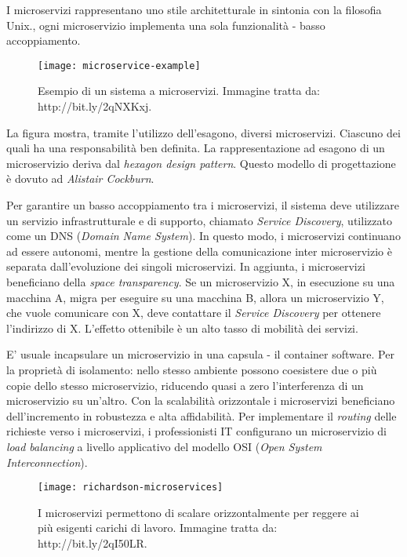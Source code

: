 I microservizi rappresentano uno stile architetturale in sintonia con la 
filosofia Unix., ogni microservizio implementa una sola funzionalità - basso 
accoppiamento.

\begin{figure}[htbp]
	\begin{center}
		\texttt{[image: microservice-example]}
		\caption{Esempio di un sistema a microservizi. Immagine tratta 
                 da: http://bit.ly/2qNXKxj.}
	\end{center}
\end{figure}

La figura mostra, tramite l'utilizzo dell'esagono, diversi microservizi. 
Ciascuno dei quali ha una responsabilità ben definita. La rappresentazione 
ad esagono di un microservizio deriva dal \emph{hexagon design pattern}. 
Questo modello di progettazione è dovuto ad \emph{Alistair Cockburn}.

Per garantire un basso accoppiamento tra i microservizi, 
il sistema deve utilizzare un servizio infrastrutturale e di 
supporto, chiamato \textit{Service Discovery}, utilizzato come un DNS 
(\textit{Domain Name System}). In questo modo, i microservizi continuano ad 
essere autonomi, mentre la gestione della comunicazione inter microservizio è 
separata dall'evoluzione dei singoli microservizi. 
In aggiunta, i microservizi beneficiano della \textit{space transparency}. Se 
un microservizio X, in esecuzione su una macchina A, migra per eseguire su una 
macchina B, allora un microservizio Y, che vuole comunicare con X, deve 
contattare il \textit{Service Discovery} per ottenere l'indirizzo di X. 
L'effetto ottenibile è un alto tasso di mobilità dei servizi.  

E' usuale incapsulare un microservizio in una capsula - il container software. 
Per la proprietà di isolamento: nello stesso ambiente possono coesistere due o 
più copie dello stesso microservizio, riducendo quasi a zero l'interferenza di 
un microservizio su un'altro. 
Con la scalabilità orizzontale i microservizi beneficiano dell'incremento in 
robustezza e alta affidabilità. Per implementare il \textit{routing} delle 
richieste verso i microservizi, i professionisti IT configurano un 
microservizio di \textit{load balancing} a livello applicativo del modello OSI 
(\textit{Open System Interconnection}).


\begin{figure}[htbp]
	\begin{center}
		\texttt{[image: richardson-microservices]}
		\caption{I microservizi permettono di scalare orizzontalmente 
                 per reggere ai più esigenti carichi di lavoro. Immagine tratta da: 
                 http://bit.ly/2qI50LR.}
	\end{center}
\end{figure}

